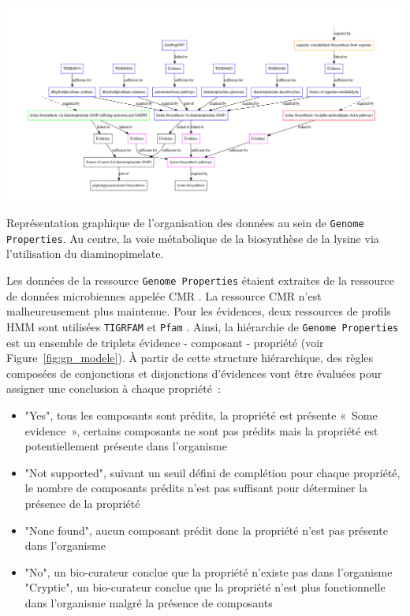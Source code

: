 \begin{refsegment}
    \begin{shadedfigure}[H]
        \centering
        \includegraphics[width=\textwidth]{img/lysine_biosynthesis.pdf}
        \caption{ Représentation graphique de l'organisation des données au sein de \texttt{Genome Properties}. Au centre, la voie métabolique de la biosynthèse de la lysine via l'utilisation du diaminopimelate. }
        \label{fig:gp_lysine}
    \end{shadedfigure}

    Les données de  la ressource \texttt{Genome Properties} étaient extraites de la ressource de données microbiennes appelée \gls{CMR} \cite{peterson2001comprehensive,davidsen2009comprehensive}. La ressource \gls{CMR} n’est malheureusement plus maintenue. Pour les évidences, deux ressources de profils \gls{HMM} sont utilisées \texttt{TIGRFAM} \cite{haft2003tigrfams}\label{key} et \texttt{Pfam} \cite{bateman2000pfam,bateman2002pfam,bateman2004pfam,finn2008pfam,finn2009pfam,punta2011pfam,finn2013pfam,finn2016pfam}. Ainsi, la hiérarchie de \texttt{Genome Properties} est un ensemble de triplets évidence - composant - propriété (voir Figure~\cref{fig:gp_modele}). À partir de cette structure hiérarchique, des règles composées de conjonctions et disjonctions d’évidences vont être évaluées pour assigner une conclusion à chaque propriété :
    \begin{itemize}
        \item "Yes", tous les composants sont prédits, la propriété est présente
        « Some evidence », certains composants ne sont pas prédits mais la propriété est potentiellement présente dans l’organisme
        \item "Not supported", suivant un seuil défini de complétion pour chaque propriété, le nombre de composants prédits n’est pas suffisant pour déterminer la présence de la propriété
        \item "None found", aucun composant prédit donc la propriété n’est pas présente dans l’organisme
        \item "No", un bio-curateur conclue que la propriété n’existe pas dans l’organisme
        "Cryptic", un bio-curateur conclue que la propriété n’est plus fonctionnelle dans l’organisme malgré la présence de composants
    \end{itemize}
    

\end{refsegment}
